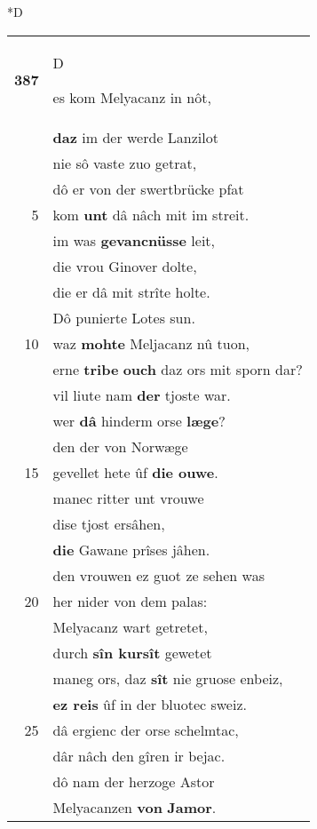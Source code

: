 \documentclass[8pt,a4paper,notitlepage]{article}
\begin{document}
\begin{table}[ht]
\begin{minipage}[t]{0.5\linewidth}
\small
\begin{center}*D
\end{center}
\begin{tabular}{rl}
\textbf{387} & \begin{large}D\end{large}es kom Melyacanz in nôt,\\ 
 & \textbf{daz} im der werde Lanzilot\\ 
 & nie sô vaste zuo getrat,\\ 
 & dô er von der swertbrücke pfat\\ 
5 & kom \textbf{unt} dâ nâch mit im streit.\\ 
 & im was \textbf{gevancnüsse} leit,\\ 
 & die vrou Ginover dolte,\\ 
 & die er dâ mit strîte holte.\\ 
 & Dô punierte Lotes sun.\\ 
10 & waz \textbf{mohte} Meljacanz nû tuon,\\ 
 & erne \textbf{tribe} \textbf{ouch} daz ors mit sporn dar?\\ 
 & vil liute nam \textbf{der} tjoste war.\\ 
 & wer \textbf{dâ} hinderm orse \textbf{læge}?\\ 
 & den der von Norwæge\\ 
15 & gevellet hete ûf \textbf{die ouwe}.\\ 
 & manec ritter unt vrouwe\\ 
 & dise tjost ersâhen,\\ 
 & \textbf{die} Gawane prîses jâhen.\\ 
 & den vrouwen ez guot ze sehen was\\ 
20 & her nider von dem palas:\\ 
 & Melyacanz wart getretet,\\ 
 & durch \textbf{sîn kursît} gewetet\\ 
 & maneg ors, daz \textbf{sît} nie gruose enbeiz,\\ 
 & \textbf{ez reis} ûf in der bluotec sweiz.\\ 
25 & dâ ergienc der orse schelmtac,\\ 
 & dâr nâch den gîren ir bejac.\\ 
 & dô nam der herzoge Astor\\ 
 & Melyacanzen \textbf{von} \textbf{Jamor}.\\ 

\end{tabular}
\end{minipage}
\end{table}
\end{document}
